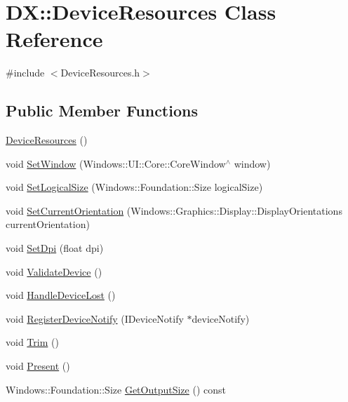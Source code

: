 \hypertarget{class_d_x_1_1_device_resources}{}\section{DX\+:\+:Device\+Resources Class Reference}
\label{class_d_x_1_1_device_resources}


{\ttfamily \#include $<$Device\+Resources.\+h$>$}

\subsection*{Public Member Functions}
\begin{DoxyCompactItemize}
\item 
\hyperlink{class_d_x_1_1_device_resources_a7843d3aa1cd744a1502aac9124003ce5}{Device\+Resources} ()
\item 
void \hyperlink{class_d_x_1_1_device_resources_afade3e7ebc3d153276f9861fed230de9}{Set\+Window} (Windows\+::\+U\+I\+::\+Core\+::\+Core\+Window$^\wedge$ window)
\item 
void \hyperlink{class_d_x_1_1_device_resources_acc9a2f10b9169be501fad3e33e57e8da}{Set\+Logical\+Size} (Windows\+::\+Foundation\+::\+Size logical\+Size)
\item 
void \hyperlink{class_d_x_1_1_device_resources_a2359020a92c52275ec126bdf7a4ea003}{Set\+Current\+Orientation} (Windows\+::\+Graphics\+::\+Display\+::\+Display\+Orientations current\+Orientation)
\item 
void \hyperlink{class_d_x_1_1_device_resources_a82722ab9c5a11d27664e89b6a375902e}{Set\+Dpi} (float dpi)
\item 
void \hyperlink{class_d_x_1_1_device_resources_ab6976bc6f653fab6899b53a4b5308b06}{Validate\+Device} ()
\item 
void \hyperlink{class_d_x_1_1_device_resources_a31e56fca128c6e4dde8de9735dfa24c8}{Handle\+Device\+Lost} ()
\item 
void \hyperlink{class_d_x_1_1_device_resources_a89d3389fdd5d832fbf0322ad1452d08f}{Register\+Device\+Notify} (I\+Device\+Notify $\ast$device\+Notify)
\item 
void \hyperlink{class_d_x_1_1_device_resources_ac8a6eb7a3a4de63e0316382a0c3ac4a4}{Trim} ()
\item 
void \hyperlink{class_d_x_1_1_device_resources_aba74d5a48d23672e6963be1413b054d0}{Present} ()
\item 
Windows\+::\+Foundation\+::\+Size \hyperlink{class_d_x_1_1_device_resources_a098dec113d2c7614c1be33f6db3c2372}{Get\+Output\+Size} () const

\end{DoxyCompactItemize}
